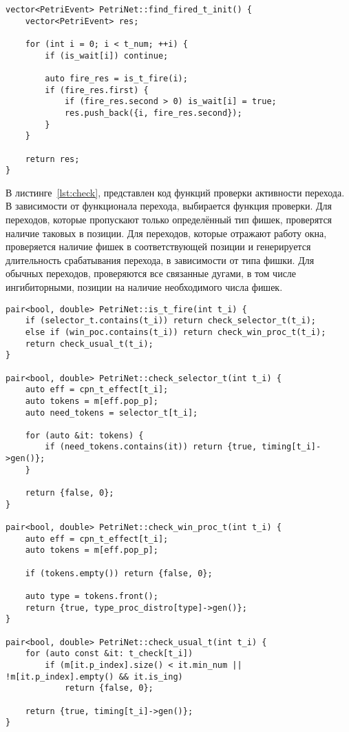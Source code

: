 \begin{center}
	\captionsetup{justification=raggedright,singlelinecheck=off}
	\begin{lstlisting}[label=lst:find,caption=Функция поиска активного перехода ,showstringspaces=false]
vector<PetriEvent> PetriNet::find_fired_t_init() {
	vector<PetriEvent> res;
	
	for (int i = 0; i < t_num; ++i) {
		if (is_wait[i]) continue;
		
		auto fire_res = is_t_fire(i);
		if (fire_res.first) {
			if (fire_res.second > 0) is_wait[i] = true;
			res.push_back({i, fire_res.second});
		}
	}
	
	return res;
}
	\end{lstlisting}
\end{center}
\FloatBarrier

В листинге~\ref{lst:check}, представлен код функций проверки активности перехода. В зависимости от функционала перехода, выбирается функция проверки. Для переходов, которые пропускают только определённый тип фишек, проверятся наличие таковых в позиции. Для переходов, которые отражают работу окна, проверяется наличие фишек в соответствующей позиции и генерируется длительность срабатывания перехода, в зависимости от типа фишки. Для обычных переходов, проверяются все связанные дугами, в том числе ингибиторными, позиции на наличие необходимого числа фишек.

\begin{center}
	\captionsetup{justification=raggedright,singlelinecheck=off}
	\begin{lstlisting}[label=lst:check,caption=Функции проверки автивности перехода ,showstringspaces=false]
pair<bool, double> PetriNet::is_t_fire(int t_i) {
	if (selector_t.contains(t_i)) return check_selector_t(t_i);
	else if (win_poc.contains(t_i)) return check_win_proc_t(t_i);
	return check_usual_t(t_i);
}

pair<bool, double> PetriNet::check_selector_t(int t_i) {
	auto eff = cpn_t_effect[t_i];
	auto tokens = m[eff.pop_p];
	auto need_tokens = selector_t[t_i];
	
	for (auto &it: tokens) {
		if (need_tokens.contains(it)) return {true, timing[t_i]->gen()};
	}
	
	return {false, 0};
}

pair<bool, double> PetriNet::check_win_proc_t(int t_i) {
	auto eff = cpn_t_effect[t_i];
	auto tokens = m[eff.pop_p];
	
	if (tokens.empty()) return {false, 0};
	
	auto type = tokens.front();
	return {true, type_proc_distro[type]->gen()};
}

pair<bool, double> PetriNet::check_usual_t(int t_i) {
	for (auto const &it: t_check[t_i])
		if (m[it.p_index].size() < it.min_num || !m[it.p_index].empty() && it.is_ing)
			return {false, 0};
	
	return {true, timing[t_i]->gen()};
}
	\end{lstlisting}
\end{center}
\FloatBarrier

